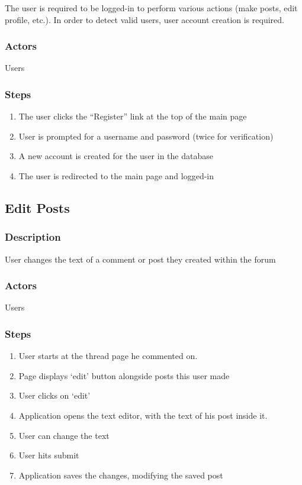 \documentclass[12pt]{scrartcl}
\begin{document}
The user is required to be logged-in to perform various actions (make posts, edit profile, etc.).
In order to detect valid users, user account creation is required. 

\subsubsection{Actors}

Users

\subsubsection{Steps}

\begin{enumerate}
\item The user clicks the ``Register'' link at the top of the main page
\item User is prompted for a username and password (twice for verification)
\item A new account is created for the user in the database
\item The user is redirected to the main page and logged-in
\end{enumerate}

\subsection{Edit Posts}
\subsubsection{Description}

User changes the text of a comment or post they created within the forum

\subsubsection{Actors}

Users

\subsubsection{Steps}

\begin{enumerate}
\item User starts at the thread page he commented on.
\item Page displays ‘edit’ button alongside posts this user made
\item User clicks on ‘edit’
\item Application opens the text editor, with the text of his post inside it.
\item User can change the text
\item User hits submit
\item  Application saves the changes, modifying the saved post
\end{enumerate}
\end{document}
